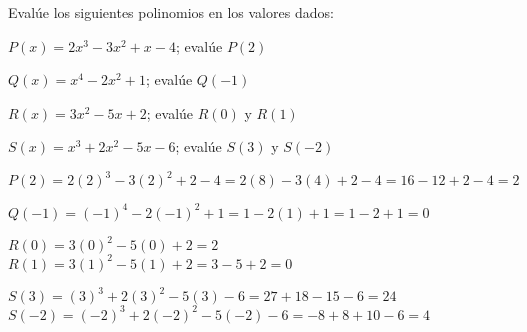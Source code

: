 \begin{exercise}
\problem Evalúe los siguientes polinomios en los valores dados:

\begin{exerciselist}
    \item $P(x) = 2x^3 - 3x^2 + x - 4$; evalúe $P(2)$
    \item $Q(x) = x^4 - 2x^2 + 1$; evalúe $Q(-1)$
    \item $R(x) = 3x^2 - 5x + 2$; evalúe $R(0)$ y $R(1)$
    \item $S(x) = x^3 + 2x^2 - 5x - 6$; evalúe $S(3)$ y $S(-2)$
\end{exerciselist}

\begin{solucion}
\begin{exerciselist}
    \item $P(2) = 2(2)^3 - 3(2)^2 + 2 - 4 = 2(8) - 3(4) + 2 - 4 = 16 - 12 + 2 - 4 = 2$
    
    \item $Q(-1) = (-1)^4 - 2(-1)^2 + 1 = 1 - 2(1) + 1 = 1 - 2 + 1 = 0$
    
    \item $R(0) = 3(0)^2 - 5(0) + 2 = 2$\\
    $R(1) = 3(1)^2 - 5(1) + 2 = 3 - 5 + 2 = 0$
    
    \item $S(3) = (3)^3 + 2(3)^2 - 5(3) - 6 = 27 + 18 - 15 - 6 = 24$\\
    $S(-2) = (-2)^3 + 2(-2)^2 - 5(-2) - 6 = -8 + 8 + 10 - 6 = 4$
\end{exerciselist}
\end{solucion}
\end{exercise}


